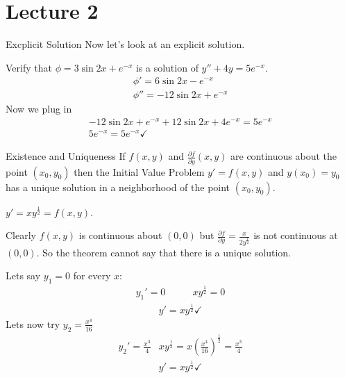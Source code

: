 \section{Lecture 2}
\begin{example}{Excplicit Solution}{}
    Now let's look at an explicit solution. \par
    Verify that $\phi = 3\sin 2x + e^{-x}$ is a solution of $y'' + 4y = 5e^{-x}$.
    \begin{align*}
        \phi ' = 6\sin {2x} - e^{-x} \\
        \phi '' = -12\sin {2x} + e^{-x} 
    \end{align*}
    Now we plug in
    \begin{gather*}
        -12\sin {2x} + e^{-x} + 12\sin 2x + 4e^{-x} = 5e^{-x} \\
        5e^{-x} = 5e^{-x} \checkmark
    \end{gather*}
\end{example}

\begin{theorem}{Existence and Uniqueness}{}
    If $f(x,y)$ and $\frac{\partial f}{\partial y}(x,y)$ are continuous about the point $(x_0, y_0)$ then the Initial Value Problem $y' = f(x,y)$ and $y(x_0) = y_0$ has a unique solution in a neighborhood of the point $(x_0,y_0)$.
\end{theorem}

\begin{example}{}{}
    $y' = xy^{\frac 12} = f(x,y)$. \par
    Clearly $f(x,y)$ is continuous about $(0,0)$ but $\frac{\partial f}{\partial y} = \frac{x}{2y^{\frac 12}}$ is not continuous at $(0,0)$. So the theorem cannot say that there is a unique solution. \par
    Lets say $y_1 = 0$ for every $x$:
    \begin{align*}
        y_1' = 0 \quad & \quad xy^{\frac 12} = 0 
    \end{align*}
    \begin{gather*}
        y' = xy^{\frac 12} \checkmark
    \end{gather*}
    Lets now try $y_2 = \frac{x^4}{16}$
    \begin{align*}
        y_2' = \frac{x^3}{4} & xy^{\frac 12} = x(\frac{x^4}{16})^{\frac 12} = \frac{x^3}{4}
    \end{align*}
    \begin{gather*}
        y' = xy^{\frac 12} \checkmark
    \end{gather*}
\end{example}

